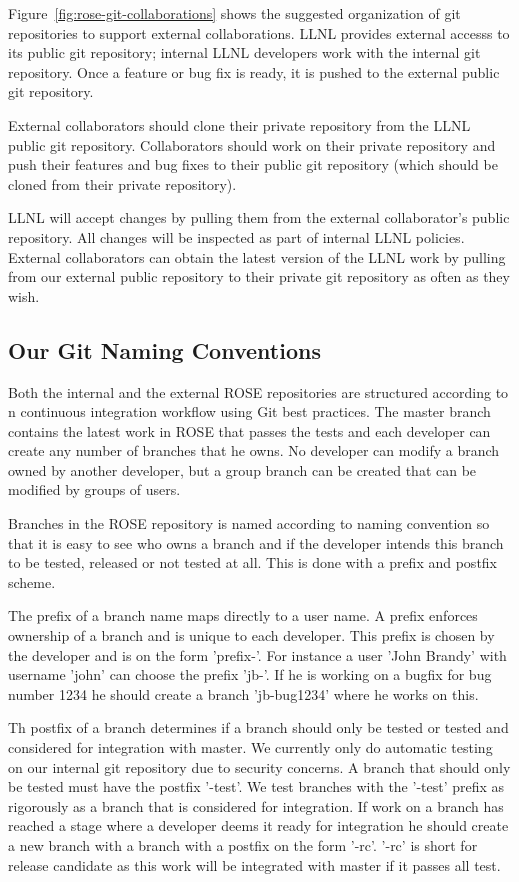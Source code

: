 Figure~\ref{fig:rose-git-collaborations} shows the suggested organization of 
git repositories to support external collaborations.  LLNL provides 
external accesss to its public git repository; internal LLNL
developers work with the internal git repository. Once a feature or 
bug fix is ready, it is pushed to the external public git 
repository. 

External collaborators should clone their private repository from
the LLNL public git repository.  Collaborators should work on their
private repository and push their features and bug fixes to their
public git repository (which should be cloned from their private
repository).

LLNL will accept changes by pulling them from the external collaborator's
public repository.  All changes will be inspected as part of internal 
LLNL policies. External collaborators can obtain the latest version of
the LLNL work by pulling from our external public repository to their
private git repository as often as they wish.



\subsection{Our Git Naming Conventions}

Both the internal and the external ROSE repositories are structured according to
n continuous integration workflow using Git best practices. The master branch
contains the latest work in ROSE that passes the tests and each developer can
create any number of branches that he owns. No developer can modify
a branch owned by another developer, but a group branch can be created that 
can be modified by groups of users. 

Branches in the ROSE repository is named according to naming convention so that 
it is easy to see who owns a branch and if the developer intends this branch to
be tested, released or not tested at all. This is done with a prefix and postfix
scheme.

The prefix of a branch name maps directly to a user name. A prefix enforces 
ownership of a branch and is unique to each developer. This prefix is chosen
by the developer and is on the form 'prefix-'. For instance a user 'John Brandy' 
with username 'john' can choose the prefix 'jb-'. If he is working on a bugfix
for bug number 1234 he should create a branch 'jb-bug1234' where he works on this.

Th postfix of a branch determines if a branch should only be tested or tested and
considered for integration with master. We currently only do automatic testing on
our internal git repository due to security concerns. A branch that should only be 
tested must have the postfix '-test'. We test branches with the '-test' prefix as 
rigorously as a branch that is considered for integration. If work on a branch has
reached a stage where a developer deems it ready for integration he should create
a new branch with a branch with a postfix on the form '-rc'. '-rc' is short for
release candidate as this work will be integrated with master if it passes all test.


